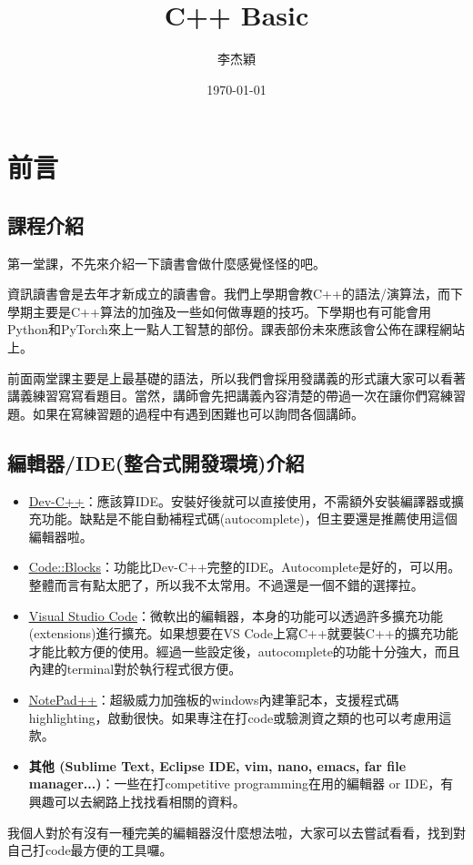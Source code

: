 \documentclass[a4paper, 11pt, oneside]{book}
\title{C++ Basic}
\author{李杰穎}
\date{\today} %
\begin{document}
\maketitle
\tableofcontents

\chapter{前言}
\section{課程介紹}
第一堂課，不先來介紹一下讀書會做什麼感覺怪怪的吧。

資訊讀書會是去年才新成立的讀書會。我們上學期會教C++的語法/演算法，而下學期主要是C++算法的加強及一些如何做專題的技巧。下學期也有可能會用Python和PyTorch來上一點人工智慧的部份。課表部份未來應該會公佈在課程網站上。

前面兩堂課主要是上最基礎的語法，所以我們會採用發講義的形式讓大家可以看著講義練習寫寫看題目。當然，講師會先把講義內容清楚的帶過一次在讓你們寫練習題。如果在寫練習題的過程中有遇到困難也可以詢問各個講師。

\section{編輯器/IDE(整合式開發環境)介紹}
\begin{itemize}
	\item \href{https://sourceforge.net/projects/orwelldevcpp/}{\underline{Dev-C++}}：應該算IDE。安裝好後就可以直接使用，不需額外安裝編譯器或擴充功能。缺點是不能自動補程式碼(autocomplete)，但主要還是推薦使用這個編輯器啦。
	\item \href{https://sourceforge.net/projects/codeblocks/files/Binaries/20.03/Windows/codeblocks-20.03-setup.exe/download}{\underline{Code::Blocks}}：功能比Dev-C++完整的IDE。Autocomplete是好的，可以用。整體而言有點太肥了，所以我不太常用。不過還是一個不錯的選擇拉。
	\item \href{https://code.visualstudio.com/}{\underline{Visual Studio Code}}：微軟出的編輯器，本身的功能可以透過許多擴充功能(extensions)進行擴充。如果想要在VS Code上寫C++就要裝C++的擴充功能才能比較方便的使用。經過一些設定後，autocomplete的功能十分強大，而且內建的terminal對於執行程式很方便。
	\item \href{https://notepad-plus-plus.org/}{\underline{NotePad++}}：超級威力加強板的windows內建筆記本，支援程式碼highlighting，啟動很快。如果專注在打code或驗測資之類的也可以考慮用這款。
	\item \textbf{其他 (Sublime Text, Eclipse IDE, vim, nano, emacs, far file manager...)}：一些在打competitive programming在用的編輯器 or IDE，有興趣可以去網路上找找看相關的資料。
\end{itemize}
我個人對於有沒有一種完美的編輯器沒什麼想法啦，大家可以去嘗試看看，找到對自己打code最方便的工具囉。
\end{document}
